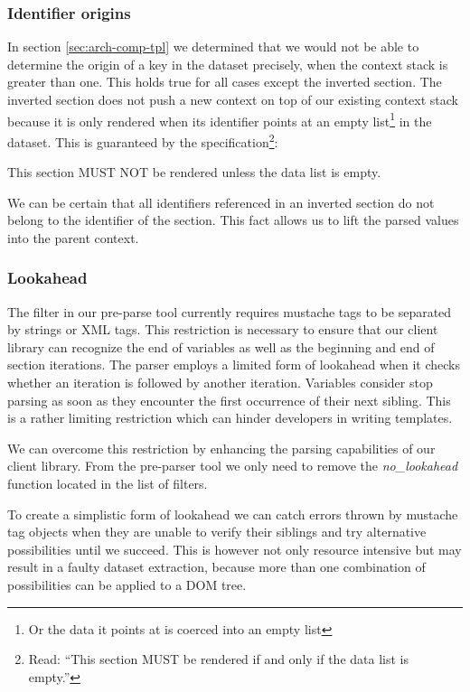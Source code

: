 \documentclass[thesis.tex]{subfiles}
\begin{document}
\subsubsection{Identifier origins}
In section \ref{sec:arch-comp-tpl} we determined that we would not be able to
determine the origin of a key in the dataset precisely, when the context
stack is greater than one. This holds true for all cases except the inverted
section. The inverted section does not push a new context on top of our existing
context stack because it is only rendered when its identifier points at an empty
list\footnote{
	Or the data it points at is coerced into an empty list
} in the dataset. This is guaranteed by the specification\footnote{
	Read: ``This section MUST be rendered if and only if the data list is empty.''
}:
\begin{citequote}{\cite[inverted.yml]{MSTSPEC}}
This section MUST NOT be rendered unless the data list is empty.
\end{citequote}
We can be certain that all identifiers referenced in an inverted section do not
belong to the identifier of the section. This fact allows us to lift the parsed
values into the parent context.

\subsubsection{Lookahead}
\label{sec:lookahead}
The filter in our pre-parse tool currently requires mustache tags to be
separated by strings or XML tags. This restriction is necessary to ensure that
our client library can recognize the end of variables as well as the beginning
and end of section iterations. The parser employs a limited form of lookahead
when it checks whether an iteration is followed by another iteration. Variables
consider stop parsing as soon as they encounter the first occurrence of their
next sibling. This is a rather limiting restriction which can hinder developers
in writing templates.

We can overcome this restriction by enhancing the parsing capabilities of our
client library. From the pre-parser tool we only need to remove the
\emph{no\_lookahead} function located in the list of filters.

To create a simplistic form of lookahead we can catch errors thrown by
mustache tag objects when they are unable to verify their siblings and try
alternative possibilities until we succeed. This is however not only resource
intensive but may result in a faulty dataset extraction, because more than one
combination of possibilities can be applied to a DOM tree.
\end{document}
